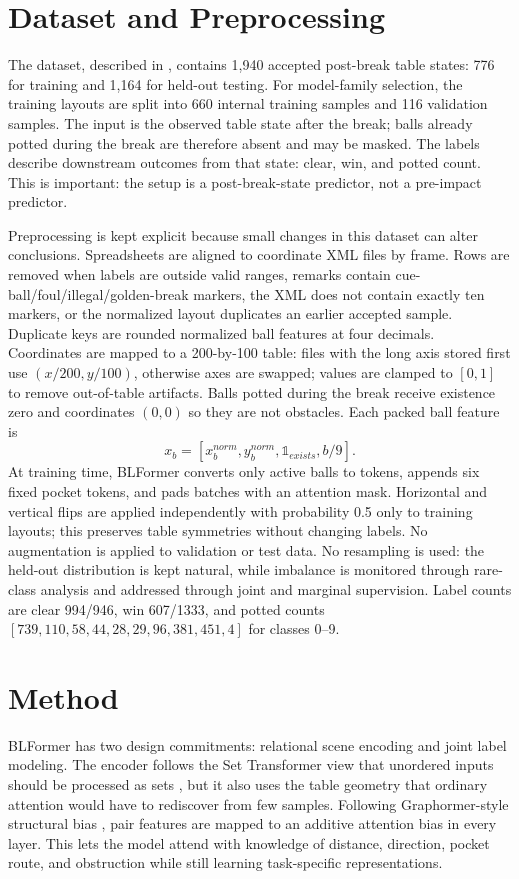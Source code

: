 \documentclass[12pt]{article}
\begin{document}
\section{Dataset and Preprocessing}
The dataset, described in \cite{zhang2024billiards}, contains 1,940 accepted post-break table states: 776 for training and 1,164 for held-out testing.  For model-family selection, the training layouts are split into 660 internal training samples and 116 validation samples.  The input is the observed table state after the break; balls already potted during the break are therefore absent and may be masked.  The labels describe downstream outcomes from that state: clear, win, and potted count.  This is important: the setup is a post-break-state predictor, not a pre-impact predictor.

Preprocessing is kept explicit because small changes in this dataset can alter conclusions.  Spreadsheets are aligned to coordinate XML files by frame.  Rows are removed when labels are outside valid ranges, remarks contain cue-ball/foul/illegal/golden-break markers, the XML does not contain exactly ten markers, or the normalized layout duplicates an earlier accepted sample.  Duplicate keys are rounded normalized ball features at four decimals.  Coordinates are mapped to a 200-by-100 table: files with the long axis stored first use $(x/200,y/100)$, otherwise axes are swapped; values are clamped to $[0,1]$ to remove out-of-table artifacts.  Balls potted during the break receive existence zero and coordinates $(0,0)$ so they are not obstacles.  Each packed ball feature is
\[
  x_b = [x_b^{norm}, y_b^{norm}, \mathbb{1}_{exists}, b/9].
\]
At training time, BLFormer converts only active balls to tokens, appends six fixed pocket tokens, and pads batches with an attention mask.  Horizontal and vertical flips are applied independently with probability 0.5 only to training layouts; this preserves table symmetries without changing labels.  No augmentation is applied to validation or test data.  No resampling is used: the held-out distribution is kept natural, while imbalance is monitored through rare-class analysis and addressed through joint and marginal supervision.  Label counts are clear 994/946, win 607/1333, and potted counts $[739,110,58,44,28,29,96,381,451,4]$ for classes 0--9.

\section{Method}
BLFormer has two design commitments: relational scene encoding and joint label modeling.  The encoder follows the Set Transformer view that unordered inputs should be processed as sets \cite{lee2019set}, but it also uses the table geometry that ordinary attention would have to rediscover from few samples.  Following Graphormer-style structural bias \cite{ying2021graphormer}, pair features are mapped to an additive attention bias in every layer.  This lets the model attend with knowledge of distance, direction, pocket route, and obstruction while still learning task-specific representations.
\end{document}
